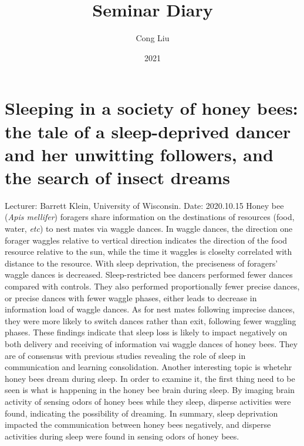 \documentclass[11pt]{article}
\title{Seminar Diary}
\author{Cong Liu\footnotemark[1]}
\date{2021}
\begin{document}
  \maketitle
  \newpage
    
  \linenumbers
  \section{Sleeping in a society of honey bees: the tale of a sleep-deprived dancer and her unwitting followers, and the search of insect dreams}
  Lecturer: Barrett Klein, University of Wisconsin.
  \newline
  Date: 2020.10.15
  \newline
  Honey bee (\textit{Apis mellifer}) foragers share information on the destinations of resources (food, water, \textit{etc}) to nest mates via waggle dances. 
  In waggle dances, the direction one forager waggles relative to vertical direction indicates the direction of the food resource relative to the sun, while the time it waggles is closelty correlated with distance to the resource.
  \newline 
  With sleep deprivation, the preciseness of foragers' waggle dances is decreased. 
  Sleep-restricted bee dancers performed fewer dances compared with controls. 
  They also performed proportionally fewer precise dances, or precise dances with fewer waggle phases, either leads to decrease in information load of waggle dances. 
  As for nest mates following imprecise dances, they were more likely to switch dances rather than exit, following fewer waggling phases. 
  These findings indicate that sleep loss is likely to impact negatively on both delivery and receiving of information vai waggle dances of honey bees. 
  They are of consensus with previous studies revealing the role of sleep in communication and learning consolidation. 
  \newline
  Another interesting topic is whetehr honey bees dream during sleep. 
  In order to examine it, the first thing need to be seen is what is happening in the honey bee brain during sleep. 
  By imaging brain activity of sensing odors of honey bees while they sleep, disperse activities were found, indicating the possibility of dreaming.
  \newline
  In summary, sleep deprivation impacted the communication between honey bees negatively, and disperse activities during sleep were found in sensing odors of honey bees.
  
  \newpage
\end{document}
